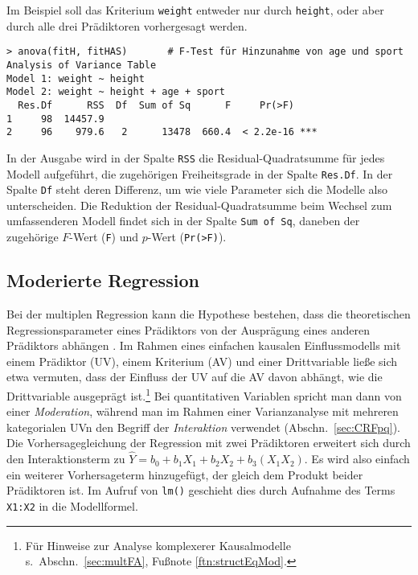 Im Beispiel soll das Kriterium \lstinline!weight! entweder nur durch \lstinline!height!, oder aber durch alle drei Prädiktoren vorhergesagt werden.
\begin{lstlisting}
> anova(fitH, fitHAS)       # F-Test für Hinzunahme von age und sport
Analysis of Variance Table
Model 1: weight ~ height
Model 2: weight ~ height + age + sport
  Res.Df      RSS  Df  Sum of Sq      F     Pr(>F)
1     98  14457.9
2     96    979.6   2      13478  660.4  < 2.2e-16 ***
\end{lstlisting}

In der Ausgabe wird in der Spalte \lstinline!RSS! die Residual-Quadratsumme für jedes Modell aufgeführt, die zugehörigen Freiheitsgrade in der Spalte \lstinline!Res.Df!. In der Spalte \lstinline!Df! steht deren Differenz, um wie viele Parameter sich die Modelle also unterscheiden. Die Reduktion der Residual-Quadratsumme beim Wechsel zum umfassenderen Modell findet sich in der Spalte \lstinline!Sum of Sq!, daneben der zugehörige $F$-Wert (\lstinline!F!) und $p$-Wert (\lstinline!Pr(>F)!).

\subsection{Moderierte Regression}
\label{sec:regrMod}

Bei der multiplen Regression kann die Hypothese bestehen, dass die theoretischen Regressionsparameter eines Prädiktors von der Ausprägung eines anderen Prädiktors abhängen \cite{Aiken1991}. Im Rahmen eines einfachen kausalen Einflussmodells mit einem Prädiktor (UV), einem Kriterium (AV) und einer Drittvariable ließe sich etwa vermuten, dass der Einfluss der UV auf die AV davon abhängt, wie die Drittvariable ausgeprägt ist.\footnote{Für Hinweise zur Analyse komplexerer Kausalmodelle s.\ Abschn.\ \ref{sec:multFA}, Fußnote \ref{ftn:structEqMod}.} Bei quantitativen Variablen spricht man dann von einer \emph{Moderation}, während man im Rahmen einer Varianzanalyse mit mehreren kategorialen UVn den Begriff der \emph{Interaktion} verwendet (Abschn.\ \ref{sec:CRFpq}). Die Vorhersagegleichung der Regression mit zwei Prädiktoren erweitert sich durch den Interaktionsterm zu $\hat{Y} = b_{0} + b_{1} X_{1} + b_{2} X_{2} + b_{3} (X_{1} X_{2})$. Es wird also einfach ein weiterer Vorhersageterm hinzugefügt, der gleich dem Produkt beider Prädiktoren ist. Im Aufruf von \lstinline!lm()! geschieht dies durch Aufnahme des Terms \lstinline!X1:X2! in die Modellformel.

